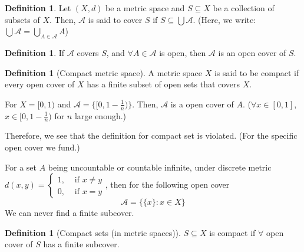 \documentclass[12pt]{article}
\theoremstyle{definition}
\newtheorem{definition}[theorem]{Definition}
\theoremstyle{plain}
\begin{document}
\begin{definition}
    Let $(X,d)$ be a metric space and $S\subseteq X$ be a collection of subsets
    of $X$. Then, $\mathcal A$ is said to cover $S$ if $S\subseteq \bigcup
    \mathcal A$. (Here, we write: $\bigcup \mathcal A = \underset{A \in \mathcal
    A}\bigcup A$)
\end{definition}

\begin{definition}
    If $\mathcal A$ covers $S$, and $\forall A \in \mathcal A$ is open, then
    $\mathcal A$ is an open cover of $S$.
\end{definition}

\begin{definition}[Compact metric space]
    A metric space $X$ is said to be compact if every open cover of $X$ has a
    finite subset of open sets that covers $X$.
\end{definition}

\begin{example}
    For $X = [0,1)$ and $\mathcal A  = \{[0, 1 - \frac{1}{n})\}$. Then,
    $\mathcal A$ is a open cover of $A$. ($\forall x \in [0,1]$, $x \in [0, 1 -
    \frac{1}{n})$ for $n$ large enough.)

    Therefore, we see that the definition for compact set is violated. (For the
    specific open cover we fund.)
\end{example}

\begin{example}
    For a set $A$ being uncountable or countable infinite, under discrete metric
    $d(x,y) =
    \begin{cases}
        1, &\text{ if } x\not= y\\
        0, &\text{ if } x= y
    \end{cases}
    $,
    then for the following open cover
    \[
        \mathcal A = \{ \{ x \}: x \in X\}
    \]
    We can never find a finite subcover.
\end{example}

\begin{definition}
    [Compact sets (in metric spaces)]
    $S\subseteq X$ is compact if $\forall $ open cover of $S$ has a finite
    subcover.
\end{definition}
\end{document}
